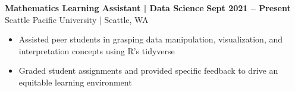 \textbf{Mathematics Learning Assistant | Data Science} \hfill \textbf{Sept 2021 -- Present} \\
    Seattle Pacific University | Seattle, WA
    \squish
    \begin{itemize}
        \item Assisted peer students in grasping data manipulation, visualization, and interpretation concepts using R's {tidyverse}
        \item Graded student assignments and provided specific feedback to drive an equitable learning environment
    \end{itemize}